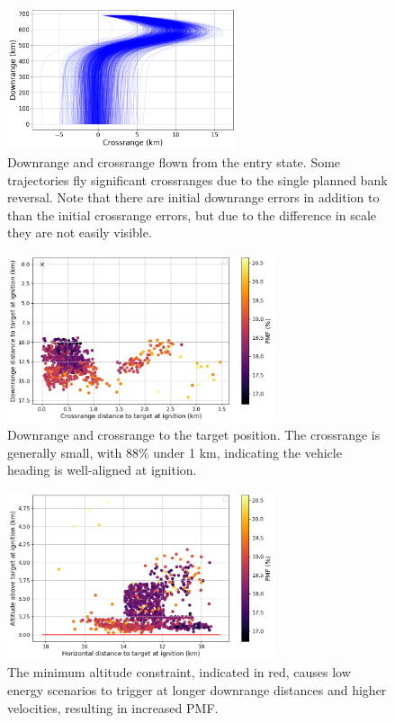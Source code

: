 \begin{figure}[h!]
	\centering
	\includegraphics[width=0.6\textwidth]{../AAS20/dr_cr} 
	\caption{Downrange and crossrange flown from the entry state. Some trajectories fly significant crossranges due to the single planned bank reversal. Note that there are initial downrange errors in addition to than the initial crossrange errors, but due to the difference in scale they are not easily visible.}
	\label{fig_mc_entry_dr_cr}
\end{figure}
\begin{figure}[h!]
	\centering
	\includegraphics[width=0.7\textwidth]{../AAS20/ignition_dr_cr} 
	\caption{Downrange and crossrange to the target position. The crossrange is generally small, with 88\% under 1 km, indicating the vehicle heading is well-aligned at ignition.}
	\label{fig_mc_ignition_dr_cr}
\end{figure}
\begin{figure}[h!]
	\centering
	\includegraphics[width=0.7\textwidth]{../AAS20/ignition_alt_range} 
	\caption{The minimum altitude constraint, indicated in red, causes low energy scenarios to trigger at longer downrange distances and higher velocities, resulting in increased PMF.}
	\label{fig_mc_ignition_alt_vs_distance}
\end{figure}
